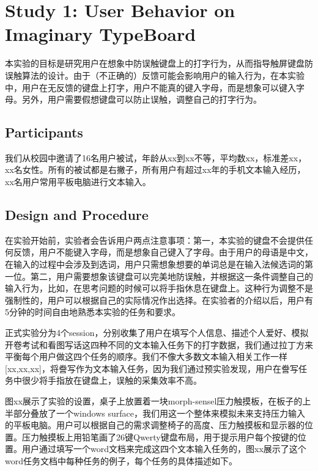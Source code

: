 \section{Study 1: User Behavior on Imaginary TypeBoard}

本实验的目标是研究用户在想象中防误触键盘上的打字行为，从而指导触屏键盘防误触算法的设计。由于（不正确的）反馈可能会影响用户的输入行为，在本实验中，用户在无反馈的键盘上打字，用户不能真的键入字母，而是想象可以键入字母。另外，用户需要假想键盘可以防止误触，调整自己的打字行为。

\subsection{Participants}

我们从校园中邀请了16名用户被试，年龄从xx到xx不等，平均数xx，标准差xx，xx名女性。所有的被试都是右撇子，所有用户有超过xx年的手机文本输入经历，xx名用户常用平板电脑进行文本输入。

\subsection{Design and Procedure}

在实验开始前，实验者会告诉用户两点注意事项：第一，本实验的键盘不会提供任何反馈，用户不能键入字母，而是想象自己键入了字母。由于用户的母语是中文，在输入的过程中会涉及到选词，用户只需想象想要的单词总是在输入法候选词的第一位。第二，用户需要想象该键盘可以完美地防误触，并根据这一条件调整自己的输入行为，比如，在思考问题的时候可以将手指休息在键盘上。这种行为调整不是强制性的，用户可以根据自己的实际情况作出选择。在实验者的介绍以后，用户有5分钟的时间自由地熟悉本实验的任务和要求。

正式实验分为4个session，分别收集了用户在填写个人信息、描述个人爱好、模拟开卷考试和看图写话这四种不同的文本输入任务下的打字数据，我们通过拉丁方来平衡每个用户做这四个任务的顺序。我们不像大多数文本输入相关工作一样[xx,xx,xx]，将誊写作为文本输入任务，因为我们通过预实验发现，用户在誊写任务中很少将手指放在键盘上，误触的采集效率不高。

图xx展示了实验的设置，桌子上放置着一块morph-sensel压力触摸板，在板子的上半部分叠放了一个windows surface，我们用这一个整体来模拟未来支持压力输入的平板电脑。用户可以根据自己的需求调整椅子的高度、压力触摸板和显示器的位置。压力触摸板上用铅笔画了26键Qwerty键盘布局，用于提示用户每个按键的位置。用户通过填写一个word文档来完成这四个文本输入任务的，图xx展示了这个word任务文档中每种任务的例子，每个任务的具体描述如下。

